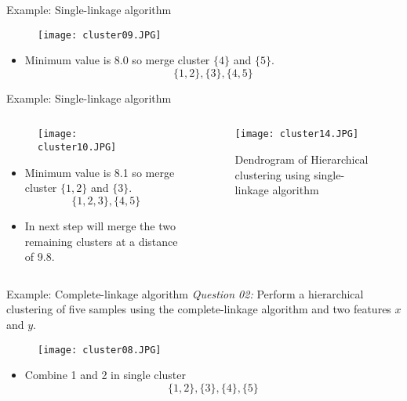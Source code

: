 \begin{frame}{Example: Single-linkage algorithm}
\begin{figure}
\texttt{[image: cluster09.JPG]}
\end{figure}
\begin{itemize}
\item Minimum value is 8.0 so merge cluster $\{4\}$ and $\{5\}$.
\begin{equation}
\{1,2\},\{3\},\{4,5\}\nonumber
\end{equation}
\end{itemize}
\end{frame}

\begin{frame}{Example: Single-linkage algorithm}
\begin{columns}
\begin{column}{5.5cm}
\begin{figure}
\texttt{[image: cluster10.JPG]}
\end{figure}
\begin{itemize}
\item Minimum value is 8.1 so merge cluster $\{1,2\}$ and $\{3\}$.
\begin{equation}
\{1,2,3\},\{4,5\}\nonumber
\end{equation}
\item In next step will merge the two remaining clusters at a distance of 9.8.
\end{itemize}
\end{column}
\begin{column}{5.5cm}
\begin{figure}
\texttt{[image: cluster14.JPG]}
\caption{Dendrogram of Hierarchical clustering using single-linkage algorithm}
\end{figure}
\end{column}
\end{columns}
\end{frame}

\begin{frame}{Example: Complete-linkage algorithm}
\textit{\color{slidecolor}Question 02:} Perform a hierarchical clustering of five samples using the complete-linkage algorithm and two features $x$ and $y$.
\begin{figure}
\texttt{[image: cluster08.JPG]}
\end{figure}
\begin{itemize}
\item Combine 1 and 2 in single cluster
\begin{equation}
\{1,2\},\{3\},\{4\},\{5\}\nonumber
\end{equation}
\end{itemize}
\end{frame}

